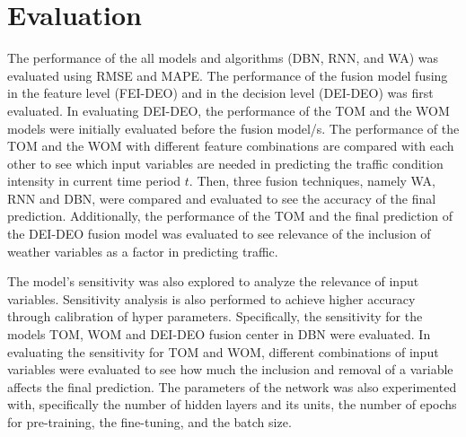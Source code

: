 \section{Evaluation}
The performance of the all models and algorithms (DBN, RNN, and WA) was evaluated using RMSE and MAPE. The performance of the fusion model fusing in the feature level (FEI-DEO) and in the decision level (DEI-DEO) was first evaluated. In evaluating DEI-DEO, the performance of the TOM and the WOM models were initially evaluated before the fusion model/s. The performance of the TOM and the WOM with different feature combinations are compared with each other to see which input variables are needed in predicting the traffic condition intensity in current time period $t$. Then, three fusion techniques, namely WA, RNN and DBN, were compared and evaluated to see the accuracy of the final prediction. Additionally, the performance of the TOM and the final prediction of the DEI-DEO fusion model was evaluated to see relevance of the inclusion of weather variables as a factor in predicting traffic.

The model’s sensitivity was also explored to analyze the relevance of input variables. Sensitivity analysis is also performed to achieve higher accuracy through calibration of hyper parameters. Specifically, the sensitivity for the models TOM, WOM and DEI-DEO fusion center in DBN were evaluated. In evaluating the sensitivity for TOM and WOM, different combinations of input variables were evaluated to see how much the inclusion and removal of a variable affects the final prediction. The parameters of the network was also experimented with, specifically the number of hidden layers and its units, the number of epochs for pre-training, the fine-tuning, and the batch size.





